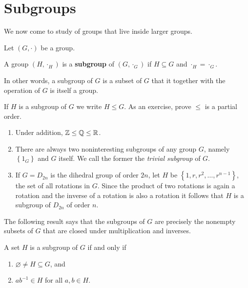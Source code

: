 \documentclass[11pt,a4paper]{article}
\begin{document}
\section{Subgroups}




We now come to study of groups that live inside larger groups.

Let \((G,\cdot)\) be a group.

\begin{defi}
    A group \((H,\cdot_H)\) is a \textbf{subgroup} of    \((G,\cdot_G)\) if \(H\subseteq G\) and \(\cdot_H = \cdot_G\).
    
\end{defi}

In other words, a subgroup of \(G\) is a subset of \(G\) that it together with the operation of \(G\) is itself a group.

If \(H\) is a subgroup of \(G\) we write \(H\leq G\).
As an exercise, prove \(\leq \) is a partial order.

\begin{exa}
\begin{enumerate}[label=(\roman*)]
    \item Under addition, \(\mathbb{Z}\leq  \mathbb{Q} \leq  \mathbb{R} \).
    \item There are always two noninteresting subgroups of any group \(G\), namely \(\left\{ 1_G \right\}\) and \(G\) itself.
    We call the former the \textit{trivial subgroup} of \(G\).
    \item If $G=D_{2 n}$ is the dihedral group of order $2 n$, let $H$ be $\left\{1, r, r^2, \ldots, r^{n-1}\right\}$, the set of all rotations in $G$. Since the product of two rotations is again a rotation and the inverse of a rotation is also a rotation it follows that $H$ is a subgroup of $D_{2 n}$ of order $n$.
\end{enumerate}
\end{exa}


The following result says that the subgroups of \(G\) are precisely the nonempty subsets of \(G\) that are closed under multiplication and inverses.

\begin{lem}
    A set \(H\) is a subgroup of \(G\) if and only if 
    \begin{enumerate}[label=(\roman*)]
        \item \(\varnothing\neq  H \subseteq G \), and 
        \item \(ab^{-1}\in H\) for all \(a,b\in H\).
    \end{enumerate}
\end{lem}
\end{document}
